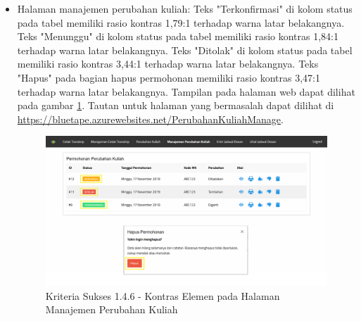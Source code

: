 \documentclass[a4paper,twoside]{article}
\begin{document}
\begin{enumerate}
\begin{itemize}
			\item Halaman manajemen perubahan kuliah: Teks "Terkonfirmasi" di kolom status pada tabel memiliki rasio kontras 1,79:1 terhadap warna latar belakangnya. Teks "Menunggu" di kolom status pada tabel memiliki rasio kontras 1,84:1 terhadap warna latar belakangnya. Teks "Ditolak" di kolom status pada tabel memiliki rasio kontras 3,44:1 terhadap warna latar belakangnya. Teks "Hapus" pada bagian hapus permohonan memiliki rasio kontras 3,47:1 terhadap warna latar belakangnya. Tampilan pada halaman web dapat dilihat pada gambar \ref{fig:1.4.6_contrast_enchanced_5}. Tautan untuk halaman yang bermasalah dapat dilihat di \url{https://bluetape.azurewebsites.net/PerubahanKuliahManage}.
			\begin{figure}[H]
				\centering  
				\includegraphics[scale=0.3, frame]{kriteria-sukses-1-4-6-contrast-enchanced-5}  
				\caption[Kriteria Sukses 1.4.6 - Kontras Elemen pada Halaman Manajemen Perubahan Kuliah]{Kriteria Sukses 1.4.6 - Kontras Elemen pada Halaman Manajemen Perubahan Kuliah}
				\label{fig:1.4.6_contrast_enchanced_5}  
			\end{figure} 
			

\end{itemize}
\end{enumerate}
\end{document}
